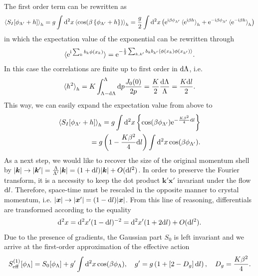 The first order term can be rewritten as
\begin{align}
    \braket{S_I[\phi_{\Lambda'}+h]}_h = g\int\mathrm d^2x\braket{\cos(\beta\left\{ \phi_{\Lambda'}+h \right\})}_h
    = \frac g2\int\mathrm d^2x\left( \mathrm e^{\mathrm i\beta \phi_{\Lambda'}}\braket{\mathrm e^{\mathrm i\beta h}}_h+\mathrm e^{-\mathrm i\beta \phi_{\Lambda'}}\braket{\mathrm e^{-\mathrm i\beta h}}_h \right)
\end{align}
in which the expectation value of the exponential can be rewritten through
\begin{align}
    \braket{\mathrm e^{\mathrm i\sum_kb_k\phi(x_k)}} = \mathrm e^{-\frac12\sum_{k,k'}b_kb_{k'}\braket{\phi(x_k)\phi(x_{k'})}}.
    \label{eq:expectation_value_exponential_fields}
\end{align}
In this case the correlations are finite up to first order in $\mathrm d\Lambda$, i.e.
\begin{align}
    \braket{h^2}_h = K\int_{\Lambda-\mathrm d\Lambda}^\Lambda\mathrm d p\frac{J_0(0)}{2p} = \frac K2\frac{\mathrm d\Lambda}\Lambda = \frac{K\mathrm d l}2.
    \label{eq:rg_hsq}
\end{align}
This way, we can easily expand the expectation value from above to
\begin{align}
    \braket{S_I[\phi_{\Lambda'}+h]}_h
    = g\int\mathrm d^2x\left\{ \cos(\beta \phi_{\Lambda'})\mathrm e^{-\frac{K\beta^2}4\mathrm d l} \right\}
    \\
    = g\left( 1 - \frac{K\beta^2}4\mathrm d l \right)\int\mathrm d^2x\cos(\beta \phi_{\Lambda'}).
\end{align}
As a next step, we would like to recover the size of the original momentum shell by $|{\bm k}|\rightarrow |{\bm k}'|=\frac{\Lambda}{\Lambda'}|{\bm k}| = (1+\mathrm d l)|{\bm k}|+O(\mathrm d l^2)$.
In order to preserve the Fourier transform, it is a necessity to keep the dot product ${\bm k'}{\bm x'}$ invariant under the flow $\mathrm d l$.
Therefore, space-time must be rescaled in the opposite manner to crystal momentum, i.e. $|{\bm x}|\rightarrow|{\bm x'}|=(1-\mathrm d l)|{\bm x}|$.
From this line of reasoning, differentials are transformed according to the equality
\begin{align}
    \mathrm d^2x = \mathrm d^2 x'(1-\mathrm d l)^{-2} = \mathrm d^2 x'(1+2\mathrm d l) + O(\mathrm d l^2).
\end{align}
Due to the presence of gradients, the Gaussian part $S_0$ is left invariant and we arrive at the first-order approximation of the effective action
\begin{align}
    S^{(1)}_{\rm eff}[\phi_\Lambda]=S_0[\phi_\Lambda] + g'\int\mathrm d^2x\cos(\beta \phi_{\Lambda}),
    \quad
    g' = g\left( 1 + \left[ 2-D_g \right]\mathrm d l \right),
    \quad
    D_g=\frac{K\beta^2}4.
    \label{eq:bkt_first_order}
\end{align}
